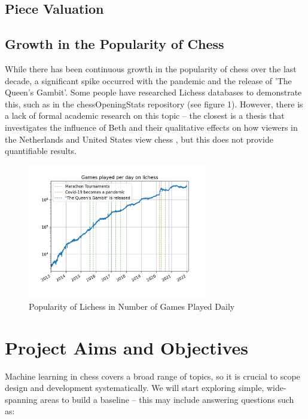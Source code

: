 \documentclass[%
 superscriptaddress,
showpacs,preprintnumbers,
 amsmath,
 amssymb,
 aps,
 pra,
showkeys,
onecolumn,
notitlepage,
11pt,
tightenlines      %
]{revtex4-1}
\begin{document}
\subsection{Piece Valuation}

\subsection{Growth in the Popularity of Chess}
While there has been continuous growth in the popularity of chess over the last decade, a significant spike occurred with the pandemic and the release of 'The Queen's Gambit'. Some people have researched Lichess databases to demonstrate this, such as in the chessOpeningStats repository (see figure 1). However, there is a lack of formal academic research on this topic -- the closest is a thesis that investigates the influence of Beth and their qualitative effects on how viewers in the Netherlands and United States view chess \cite{lowie2021big}, but this does not provide quantifiable results.

\begin{figure}[h]
    \caption{Popularity of Lichess in Number of Games Played Daily \cite{chessOpeningStats}}
    \begin{center}
    \includegraphics[width=0.7\textwidth]{images/Lichess Number of Games Played Per Day.png}
    \end{center}
\end{figure}




\section{Project Aims and Objectives}
Machine learning in chess covers a broad range of topics, so it is crucial to scope design and development systematically. We will start exploring simple, wide-spanning areas to build a baseline -- this may include answering questions such as:
\end{document}
